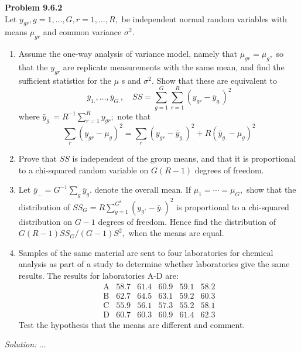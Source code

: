 \documentclass[a4paper, 11pt]{article}
\newenvironment{problem}[2][Problem]
    { \begin{mdframed}[backgroundcolor=gray!20] \textbf{#1 #2} \\}
    {  \end{mdframed}}
\newenvironment{solution}
    {\textit{Solution:}}
    {}
\begin{document}
\begin{problem}{9.6.2}
  Let $y_{g r}, g=1, \ldots, G, r=1, \ldots, R,$ be independent normal random variables with means $\mu_{g r}$ and common variance $\sigma^{2}$.
  \begin{enumerate}
    \item  Assume the one-way analysis of variance model, namely that $\mu_{g r}=\mu_{g},$ so that the $y_{g r}$ are replicate measurements with the same mean, and find the sufficient statistics for the $\mu$ s and $\sigma^{2}$. Show that these are equivalent to
    $$
    \bar{y}_{1 .}, \ldots, \bar{y}_{G .}, \quad S S=\sum_{g=1}^{G} \sum_{r=1}^{R}\left(y_{g r}-\bar{y}_{g .}\right)^{2}
    $$
    where $\bar{y}_{g .}=R^{-1} \sum_{r=1}^{R} y_{g r} ;$ note that
    $$
    \sum_{r}\left(y_{g r}-\mu_{g}\right)^{2}=\sum_{r}\left(y_{g r}-\bar{y}_{g .}\right)^{2}+R\left(\bar{y}_{g .}-\mu_{g}\right)^{2}
    $$

    \item Prove that $S S$ is independent of the group means, and that it is proportional to a chi-squared random variable on $G(R-1)$ degrees of freedom.

    \item Let $\bar{y}_{\dots}=G^{-1} \sum_{g} \bar{y}_{g}$. denote the overall mean. If $\mu_{1}=\cdots=\mu_{G},$ show that the distribution of $S S_{G}=R \sum_{g=1}^{G^{8}}\left(y_{g} .-\bar{y} .\right)^{2}$ is proportional to a chi-squared distribution on $G-1$
    degrees of freedom. Hence find the distribution of $G(R-1) S S_{G} /(G-1) S^{2},$ when the means are equal.

    \item Samples of the same material are sent to four laboratories for chemical analysis as part of a study to determine whether laboratories give the same results. The results for laboratories A-D are:
    $$\begin{array}{llllll}
    \mathrm{A} & 58.7 & 61.4 & 60.9 & 59.1 & 58.2 \\
    \mathrm{B} & 62.7 & 64.5 & 63.1 & 59.2 & 60.3 \\
    \mathrm{C} & 55.9 & 56.1 & 57.3 & 55.2 & 58.1 \\
    \mathrm{D} & 60.7 & 60.3 & 60.9 & 61.4 & 62.3
    \end{array}$$
    Test the hypothesis that the means are different and comment.

  \end{enumerate}

\end{problem}
\begin{solution}
...
\end{solution}
\end{document}
